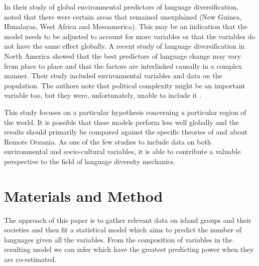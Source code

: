 \documentclass[unnumsec,webpdf,modern,medium]{oup-authoring-template}
\begin{document}
In their study of global environmental predictors of language diversification, \citet{hua2019ecological} noted that there were certain areas that remained unexplained (New Guinea, Himalayas, West Africa and Mesoamerica). This may be an indication that the model needs to be adjusted to account for more variables or that the variables do not have the same effect globally. A recent study of language diversification in North America \citep{Pacheco_Coelho_2019} showed that the best predictors of language change may vary from place to place and that the factors are interlinked causally in a complex manner. Their study included environmental variables and data on the population. The authors note that political complexity might be an important variable too, but they were, unfortunately, unable to include it \citep[7]{Pacheco_Coelho_2019}.

This study focuses on a particular hypothesis concerning a particular region of the world. It is possible that these models perform less well globally and the results should primarily be compared against the specific theories of \citet{lynch1981melanesian} and \citet{pawley81, pawley2007} about Remote Oceania. As one of the few studies to include data on both environmental and socio-cultural variables, it is able to contribute a valuable perspective to the field of language diversity mechanics.

\FloatBarrier



\FloatBarrier
\section{Materials and Method}
\label{pol_complex_method}
The approach of this paper is to gather relevant data on island groups and their societies and then fit a statistical model which aims to predict the number of languages given all the variables. From the composition of variables in the resulting model we can infer which have the greatest predicting power when they are co-estimated.
\end{document}
